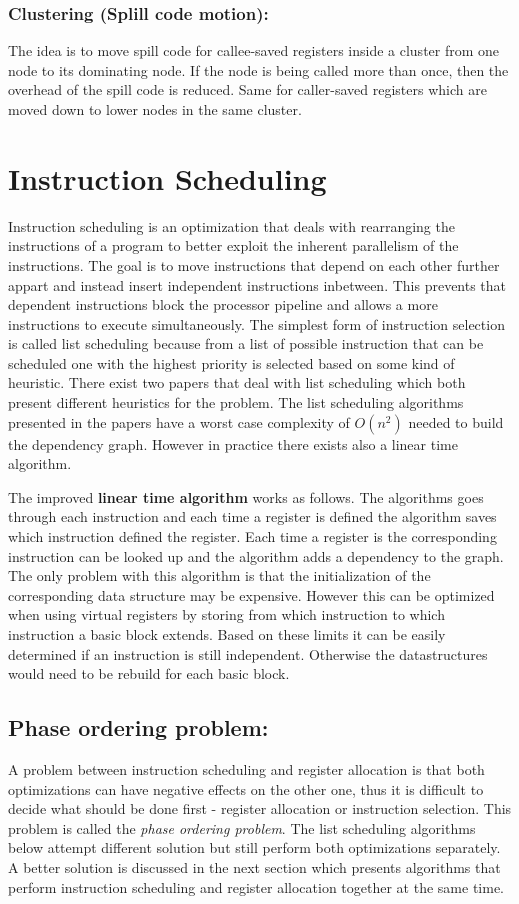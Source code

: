 \documentclass[a4paper,10pt]{article}
\begin{document}
\subsubsection*{Clustering (Splill code motion):}
The idea is to move spill code for callee-saved registers inside a cluster from one node to
its dominating node. If the node is being called more than once, then the overhead of the spill code is reduced. Same for caller-saved 
registers which are moved down to lower nodes in the same cluster.

\section{Instruction Scheduling}
Instruction scheduling is an optimization that deals with rearranging the instructions of a program to better exploit the inherent
parallelism of the instructions. The goal is to move instructions that depend on each other further appart and instead insert independent
instructions inbetween. This prevents that dependent instructions block the processor pipeline and allows a more instructions to execute 
simultaneously. The simplest form of instruction selection is called list scheduling because from a list of possible instruction that 
can be scheduled one with the highest priority is selected based on some kind of heuristic. There exist two papers that deal with list
scheduling which both present different heuristics for the problem. The list scheduling algorithms presented in the papers have a worst 
case complexity of $O(n^2)$ needed to build the dependency graph. However in practice there exists also a linear time algorithm.

The improved \textbf{linear time algorithm} works as follows. The algorithms goes through each instruction and each time a register is 
defined the algorithm saves which instruction defined the register. Each time a register is the corresponding instruction can be looked
up and the algorithm adds a dependency to the graph. The only problem with this algorithm is that the initialization of the corresponding
data structure may be expensive. However this can be optimized when using virtual registers by storing from which instruction to which
instruction a basic block extends. Based on these limits it can be easily determined if an instruction is still independent. Otherwise the
datastructures would need to be rebuild for each basic block.

\subsection{Phase ordering problem:}
A problem between instruction scheduling and register allocation is that both optimizations can have negative effects on the other one, 
thus it is difficult to decide what should be done first - register allocation or instruction selection. This problem is called the
\textit{phase ordering problem}. The list scheduling algorithms below attempt different solution but still perform both optimizations 
separately. A better solution is discussed in the next section which presents algorithms that perform instruction scheduling and register
allocation together at the same time.
\end{document}
